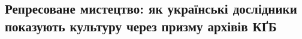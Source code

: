  
 

\subsection{Репресоване мистецтво: як українські дослідники показують культуру
через призму архівів КҐБ}

